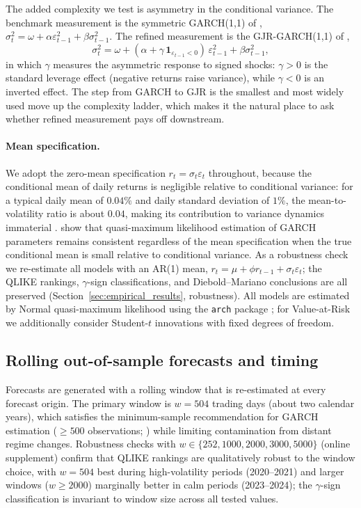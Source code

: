 The added complexity we test is asymmetry in the conditional variance. The benchmark measurement is the symmetric GARCH(1,1) of \citet{bollerslev1986}, $\sigma^2_t=\omega+\alpha\varepsilon^2_{t-1}+\beta\sigma^2_{t-1}$. The refined measurement is the GJR-GARCH(1,1) of \citet{glosten1993},
\begin{equation}
\sigma^2_t = \omega + (\alpha + \gamma\,\mathbf{1}_{\varepsilon_{t-1}<0})\,\varepsilon^2_{t-1} + \beta\sigma^2_{t-1},
\end{equation}
in which $\gamma$ measures the asymmetric response to signed shocks: $\gamma>0$ is the standard leverage effect (negative returns raise variance), while $\gamma<0$ is an inverted effect. The step from GARCH to GJR is the smallest and most widely used move up the complexity ladder, which makes it the natural place to ask whether refined measurement pays off downstream.

\paragraph{Mean specification.}
We adopt the zero-mean specification $r_t=\sigma_t\varepsilon_t$ throughout, because the conditional mean of daily returns is negligible relative to conditional variance: for a typical daily mean of $0.04\%$ and daily standard deviation of $1\%$, the mean-to-volatility ratio is about $0.04$, making its contribution to variance dynamics immaterial \citep{bollerslev1986,hansen2005}. \citet{francq2004} show that quasi-maximum likelihood estimation of GARCH parameters remains consistent regardless of the mean specification when the true conditional mean is small relative to conditional variance. As a robustness check we re-estimate all models with an AR(1) mean, $r_t=\mu+\phi r_{t-1}+\sigma_t\varepsilon_t$; the QLIKE rankings, $\gamma$-sign classifications, and Diebold--Mariano conclusions are all preserved (Section~\ref{sec:empirical_results}, robustness). All models are estimated by Normal quasi-maximum likelihood using the \texttt{arch} package \citep{sheppard2023}; for Value-at-Risk we additionally consider Student-$t$ innovations with fixed degrees of freedom.

\subsection{Rolling out-of-sample forecasts and timing}
\label{sec:rolling}

Forecasts are generated with a rolling window that is re-estimated at every forecast origin. The primary window is $w=504$ trading days (about two calendar years), which satisfies the minimum-sample recommendation for GARCH estimation ($\geq 500$ observations; \citealt{hwang2006}) while limiting contamination from distant regime changes. Robustness checks with $w\in\{252,1000,2000,3000,5000\}$ (online supplement) confirm that QLIKE rankings are qualitatively robust to the window choice, with $w=504$ best during high-volatility periods (2020--2021) and larger windows ($w\geq 2000$) marginally better in calm periods (2023--2024); the $\gamma$-sign classification is invariant to window size across all tested values.

